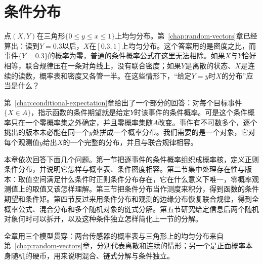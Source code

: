 \chapter{条件分布}
\label{chap:conditional-distributions}

点$(X,Y)$在三角形$\{0\leq y\leq x\leq 1\}$上均匀分布。第~\ref{chap:random-vectors}章已经算出：读到$Y=0.3$以后，$X$在$[0.3,1]$上均匀分布。这个答案用的是密度之比，而事件$\{Y=0.3\}$的概率为零，普通的条件概率公式在这里无法相除。如果$X$与$Y$恰好相等，联合规律压在一条对角线上，没有联合密度；如果$Y$是离散的状态、$X$是连续的读数，概率表和密度又各管一半。在这些情形下，“给定$Y=y$时$X$的分布”应当是什么？

第~\ref{chap:conditional-expectation}章给出了一个部分的回答：对每个目标事件$\{X\in A\}$，指示函数的条件期望就是给定$Y$时该事件的条件概率。可是这个条件概率只在一个零概率集之外确定，并且零概率集随$A$改变。事件有不可数多个，逐个挑出的版本未必能在同一个$y$处拼成一个概率分布。我们需要的是一个对象，它对每个观测值$y$给出$X$的一个完整的分布，并且与联合规律相容。

本章依次回答下面几个问题。第一节把逐事件的条件概率组织成概率核，定义正则条件分布，并说明它怎样与概率表、条件密度相容。第二节集中处理存在性与版本：取值空间满足什么条件时正则条件分布存在，它在什么意义下唯一，零概率观测值上的取值又该怎样理解。第三节把条件分布当作测度来积分，得到函数的条件期望和条件矩。第四节反过来用条件分布和观测的边缘分布恢复联合规律，得到全概率公式、混合分布和多个随机对象的链式分解。第五节研究给定信息后两个随机对象何时可以拆开，以及这种条件独立怎样简化上一节的分解。

全章用三个模型贯穿：两台传感器的概率表与三角形上的均匀分布来自第~\ref{chap:random-vectors}章，分别代表离散和连续的情形；另一个是正面概率本身随机的硬币，用来说明混合、链式分解与条件独立。












